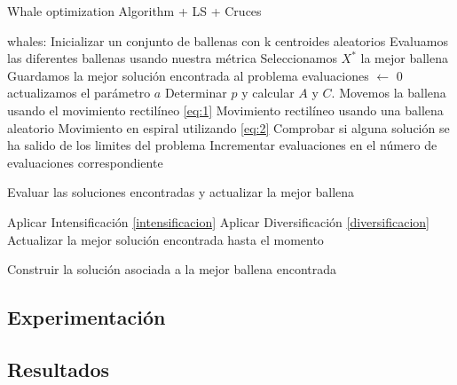 \documentclass[11pt]{article}
\begin{document}
\begin{algorithm}[H]
  \caption{Whale optimization Algorithm + LS + Cruces}
  \label{alg-lsearch}
  \begin{algorithmic}[1]
    \State whales: Inicializar un conjunto de ballenas con k centroides aleatorios
    \State Evaluamos las diferentes ballenas usando nuestra métrica 
    \State Seleccionamos $X^*$ la mejor ballena
    \State Guardamos la mejor solución encontrada al problema
    \State evaluaciones $\leftarrow$ 0
    \State actualizamos el parámetro $a$
    \State Determinar $p$ y calcular  $A$ y $C$.
    \State Movemos la ballena usando el movimiento rectilíneo \eqref{eq:1}
    \State Movimiento rectilíneo usando una ballena aleatorio
    \EndIf
    \Else
    \State Movimiento en espiral utilizando \eqref{eq:2}
    \EndIf
    \EndFor 
    \State Comprobar si alguna solución se ha salido de los limites del problema
    \State Incrementar evaluaciones en el número de evaluaciones correspondiente
    
    \State Evaluar las soluciones encontradas y actualizar la mejor ballena 

    \State Aplicar Intensificación \ref{intensificacion}
    \Else
    \State Aplicar Diversificación \ref{diversificacion}
    \EndIf
    \EndIf    
    \State Actualizar la mejor solución encontrada hasta el momento
    \EndIf

    \EndWhile
    \State
    \Return Construir la solución asociada a la mejor ballena encontrada
    \EndProcedure
  \end{algorithmic}
\end{algorithm}

\subsection{Experimentación}




\subsection{Resultados}
\end{document}
